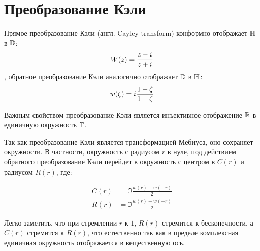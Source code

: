 
\section{Преобразование Кэли}

Прямое преобразование Кэли (англ. Cayley transform) конформно отображает $\mathbb{H}$ в $\mathbb{D}$:
\begin{equation}\label{eq:cayley}
W(z) = \frac{z - {i\mkern1mu}}{z + {i\mkern1mu}}
\end{equation}
, обратное преобразование Кэли аналогично отображает $\mathbb{D}$ в $\mathbb{H}$:
\begin{equation}\label{eq:cayley_inverse}
w(\zeta) = {i\mkern1mu} \frac{1 + \zeta}{1 - \zeta}
\end{equation}

Важным свойством преобразование Кэли является инъективное отображение $\mathbb{R}$ в единичную окружность $\mathbb{T}$.

Так как преобразование Кэли является трансформацией Мебиуса, оно сохраняет окружности. В частности, окружность с радиусом $r$ в нуле, под действием обратного преобразование Кэли перейдет в окружность с центром в $C(r)$ и радиусом $R(r)$, где:

\begin{equation}\label{eq:c_and_r}
\begin{aligned}
   C(r) &= \Im \frac{w(r) + w(-r)}{2}
\\ R(r) &= \Im \frac{w(r) - w(-r)}{2}
\end{aligned}
\end{equation}

Легко заметить, что при стремлении $r$ к $1$, $R(r)$ стремится к бесконечности, а $C(r)$ стремится к $R(r)$, что естественно так как в пределе комплексная единичная окружность отображается в вещественную ось.

